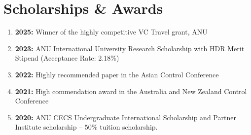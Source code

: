 \section{Scholarships \& Awards}
\begin{enumerate}\itemsep0em
    \item \textbf{2025:} Winner of the highly competitive VC Travel grant, ANU
    \item \textbf{2023:} ANU International University Research Scholarship with HDR Merit Stipend (Acceptance Rate: 2.18\%)
    \item \textbf{2022:} Highly recommended paper in the Asian Control Conference
    \item \textbf{2021:} High commendation award in the Australia and New Zealand Control Conference
    \item \textbf{2020:} ANU CECS Undergraduate International Scholarship and Partner Institute scholarship -- $50\%$ tuition scholarship.
\end{enumerate}

